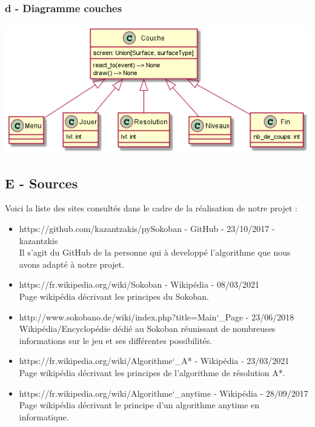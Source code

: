 \documentclass[a4paper,12pt]{article} %
\begin{document}
\subsubsection*{d - Diagramme couches}
\label{couche}
\begin{center}
	\includegraphics[scale=0.6]{images/frame.png}
\end{center}
\subsection*{E - Sources}
Voici la liste des sites consultés dans le cadre de la réalisation de notre projet :
\begin{itemize}
\item https://github.com/kazantzakis/pySokoban - GitHub - 23/10/2017 - kazantzkis
\\ Il s'agit du GitHub de la personne qui à developpé l'algorithme que nous avons adapté à notre projet.

\item https://fr.wikipedia.org/wiki/Sokoban - Wikipédia - 08/03/2021
\\ Page wikipédia décrivant les principes du Sokoban.

\item http://www.sokobano.de/wiki/index.php?title=Main\char`_Page - 23/06/2018
\\ Wikipédia/Encyclopédie dédié au Sokoban réunissant de nombreuses informations sur le jeu et ses différentes possibilités.

\item https://fr.wikipedia.org/wiki/Algorithme\char`_A* - Wikipédia - 23/03/2021
\\ Page wikipédia décrivant les principes de l'algorithme de résolution A*.

\item https://fr.wikipedia.org/wiki/Algorithme\char`_anytime - Wikipédia - 28/09/2017
\\ Page wikipédia décrivant le principe d'un algorithme anytime en informatique.

\end{itemize}
\end{document}

